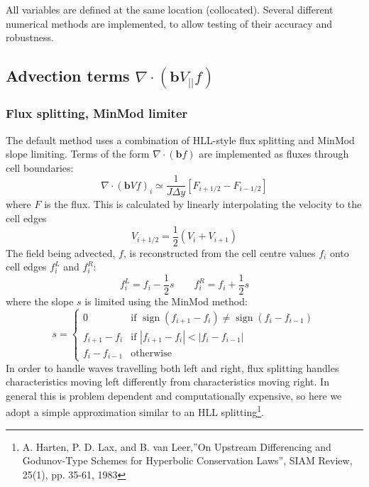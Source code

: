 \documentclass[12pt,a4paper]{article}
\begin{document}
All variables are defined at the same location (collocated).
Several different numerical methods are implemented, to allow testing of their accuracy and robustness.

\subsection{Advection terms $\nabla\cdot\left(\mathbf{b}V_{||}f\right)$}

\subsubsection{Flux splitting, MinMod limiter}
\label{sec:fluxsplit}

The default method uses a combination of HLL-style flux splitting and MinMod slope limiting. 
Terms of the form $\nabla\cdot\left(\mathbf{b} f\right)$ are implemented as fluxes through cell boundaries:
\begin{equation}
\nabla\cdot\left(\mathbf{b} V f\right)_i \simeq \frac{1}{J\Delta y} \left[ F_{i+1/2} - F_{i-1/2}\right]
\end{equation}
where $F$ is the flux. This is calculated by linearly interpolating the velocity to the cell edges
\begin{equation}
V_{i+1/2} = \frac{1}{2}\left(V_{i} + V_{i+1}\right)
\end{equation}
The field being advected, $f$, is reconstructed from the cell centre values $f_i$ onto cell edges $f^L_i$ and
$f^R_i$:
\begin{equation}
f^L_i = f_i - \frac{1}{2}s \qquad f^R_i = f_i + \frac{1}{2}s
\end{equation}
where the slope $s$ is limited using the MinMod method:
\begin{equation}
s = \left\{\begin{array}{ll}
0 & \textrm{if $\operatorname{sign}(f_{i+1} - f_{i}) \neq \operatorname{sign}(f_{i} - f_{i-1})$} \\
f_{i+1} - f_{i} & \textrm{if $\left|f_{i+1} - f_{i}\right| < \left|f_{i} - f_{i-1}\right|$} \\
f_{i} - f_{i-1} & \textrm{otherwise}
\end{array}\right.
\end{equation}
In order to handle waves travelling both left and right, flux splitting handles characteristics moving left differently from characteristics moving right. 
In general this is problem dependent and computationally expensive, so here we adopt a simple approximation similar to an HLL splitting\footnote{A. Harten, P. D. Lax, and B. van Leer,''On Upstream Differencing and Godunov-Type Schemes for Hyperbolic Conservation Laws'', SIAM Review, 25(1), pp. 35-61, 1983}. 
\end{document}
